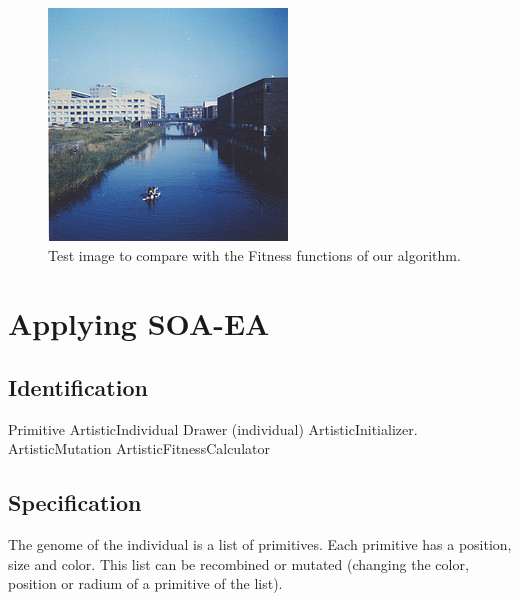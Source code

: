 \begin{figure}
\centering
   \includegraphics[scale =3] {gfx/art/flevopark.jpg}
\caption{Test image to compare with the Fitness functions of our algorithm.}
\label{fig:flevopark}
\end{figure}


\section{Applying SOA-EA}
\label{sec:art:soaea}

\subsection{Identification}

Primitive
ArtisticIndividual
Drawer (individual)
ArtisticInitializer.
ArtisticMutation
ArtisticFitnessCalculator


\subsection{Specification}

The genome of the individual is a list of
primitives. %
Each primitive has a position, size and color. This list can
be recombined or mutated (changing the color, position or radium of a
primitive of the list). 





